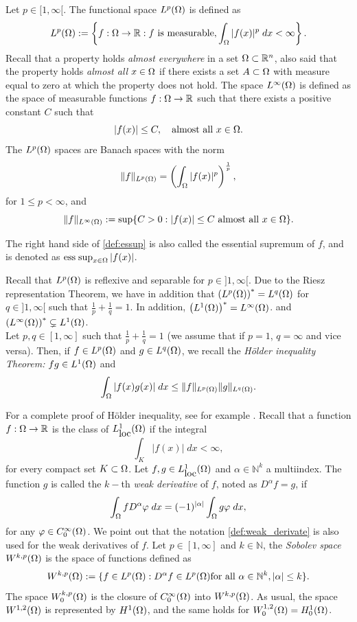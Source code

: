 Let $p\in [1,\infty[$. The functional space $L^p(\Omega)$ is defined as
\begin{equation}\label{def:l^p_space}
L^p(\Omega):=\left\{f:\Omega\to \mathbb{R}: f \mbox{ is measurable}, \int_{\Omega}|f(x)|^p\; dx<\infty\right\}.
\end{equation}
Recall that a property holds \textit{almost everywhere} in a set $\Omega\subset \mathbb{R}^n$, also said that the property holds \textit{almost all} $x\in \Omega$ if there exists a set $A\subset\Omega$  with measure equal to zero at which the property does not hold. The space $L^{\infty}(\Omega)$ is defined as the space of measurable functions $f:\Omega\to \mathbb{R}$ such that there exists a positive constant $C$ such that
\[
|f(x)|\le C,\quad \mbox{almost all }x\in \Omega.
\]
The $L^p(\Omega)$ spaces are Banach spaces with the norm
\[
\lVert f \rVert_{L^p(\Omega)}=\left(\int_{\Omega}|f(x)|^p\right)^\frac{1}{p},
\]
for $1\le p<\infty$, and 
\begin{equation}\label{def:essup}
    \lVert f \rVert_{L^{\infty}(\Omega)}:=\sup\{C>0: |f(x)|\le C\mbox{ almost all }x\in \Omega \}.
\end{equation}

The right hand side of \eqref{def:essup} is also called the essential supremum of $f$, and is denoted as $\operatorname*{ess\;sup}_{x\in \Omega}|f(x)|$.

Recall that $L^p(\Omega)$ is reflexive and separable for $p\in ]1,\infty[$. Due to the Riesz representation Theorem, we have in addition that $\left(L^p(\Omega)\right)^*=L^q(\Omega)$ for $q\in ]1,\infty[$ such that $\frac{1}{p}+\frac{1}{q}=1$. In addition, $\left(L^1(\Omega)\right)^*=L^\infty(\Omega)$. and $\left(L^\infty(\Omega)\right)^*\subsetneq L^1(\Omega)$.\\

Let $p,q \in [1,\infty]$ such that $\frac{1}{p}+\frac{1}{q}=1$ (we assume that if $p=1$, $q=\infty$ and vice versa). Then, if $f\in L^p(\Omega)$ and $g\in L^q(\Omega)$, we recall the \textit{Hölder inequality Theorem:} $fg\in L^{1}(\Omega)$ and
\[
\int_{\Omega}|f(x)g(x)|\; dx\le \lVert f \rVert_{L^p(\Omega)}\lVert g \rVert_{L^q(\Omega)}.
\]

For a complete proof of Hölder inequality, see for example \cite{brezis2010}. Recall that a function $f:\Omega\to\mathbb{R}$ is the class of $L^1_{\mbox{loc}}(\Omega)$ if the integral
\[
\int_{K}|f(x)|\; dx<\infty,
\]
for every compact set $K\subset \Omega$.  Let $f,g\in L^1_{\mbox{loc}}(\Omega)$ and $\alpha\in \mathbb{N}^k$ a multiindex. The function $g$ is called the $k-$th \textit{weak derivative} of $f$, noted as $D^\alpha f=g$, if
\[
\int_{\Omega}f D^{\alpha}\varphi \; dx=(-1)^{|\alpha|}\int_{\Omega}g \varphi \; dx,
\]
for any $\varphi\in C^{\infty}_0(\Omega)$. We point out that the notation \eqref{def:weak_derivate} is also used for the weak derivatives of $f$. 
Let $p\in [1,\infty]$ and $k\in \mathbb{N}$, the \textit{Sobolev space} $W^{k,p}(\Omega)$ is the space of functions defined as
\[
W^{k,p}(\Omega):=\{f\in L^p(\Omega): D^{\alpha}f\in L^p(\Omega) \mbox{for all }\alpha\in \mathbb{N}^{k}, |\alpha|\le k\}.
\]
The space $W^{k,p}_0(\Omega)$ is the closure of $C^{\infty}_0(\Omega)$ into $W^{k,p}(\Omega)$. As usual, the space $W^{1,2}(\Omega)$ is represented by $H^1(\Omega)$, and the same holds for $W^{1,2}_0(\Omega)=H_0^1(\Omega)$.\\

